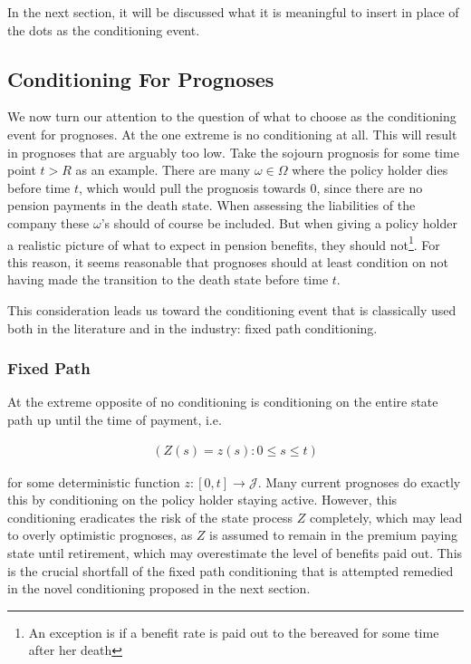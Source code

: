 \documentclass{article}
\newcommand{\1}[1]{\mathbbm{1}_{\left\lbrace #1 \right\rbrace}}
\theoremstyle{break}
\theoremstyle{remark}
\numberwithin{equation}{section}
\begin{document}
In the next section, it will be discussed what it is meaningful to insert in place of the dots as the conditioning event.

\subsection{Conditioning For Prognoses} \label{CondForProg}

We now turn our attention to the question of what to choose as the conditioning event for prognoses. At the one extreme is no conditioning at all. This will result in prognoses that are arguably too low. Take the sojourn prognosis for some time point $t>R$ as an example. There are many $\omega \in \Omega$ where the policy holder dies before time $t$, which would pull the prognosis towards 0, since there are no pension payments in the death state. When assessing the liabilities of the company these $\omega$'s should of course be included. But when giving a policy holder a realistic picture of what to expect in pension benefits, they should not\footnote{An exception is if a benefit rate is paid out to the bereaved for some time after her death}. For this reason, it seems reasonable that prognoses should at least condition on not having made the transition to the death state before time $t$.

This consideration leads us toward the conditioning event that is classically used both in the literature and in the industry: fixed path conditioning.

\subsubsection{Fixed Path}

At the extreme opposite of no conditioning is conditioning on the entire state path up until the time of payment, i.e.

\begin{align*}
\left( Z(s) = z(s) : 0 \leq s \leq t \right)
\end{align*}

for some deterministic function $z: [0,t] \to \mathcal{J}$. Many current prognoses do exactly this by conditioning on the policy holder staying active. However, this conditioning eradicates the risk of the state process $Z$ completely, which may lead to overly optimistic prognoses, as $Z$ is assumed to remain in the premium paying state until retirement, which may overestimate the level of benefits paid out. This is the crucial shortfall of the fixed path conditioning that is attempted remedied in the novel conditioning proposed in the next section.
\end{document}
